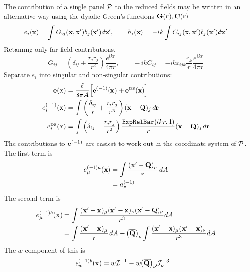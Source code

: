 \documentclass[letterpaper]{article}
\begin{document}
The contribution of a single panel $\mathcal{P}$ to the 
reduced fields may be written in an alternative way using the 
dyadic Green's functions $\mathbf{G}(\mathbf{r}), \mathbf{C}(\mathbf{r})$
$$
 e_i(\mathbf{x}) =   \int G_{ij}(\mathbf{x},\mathbf{x}^\prime) b_j(\mathbf{x}^\prime)d\mathbf{x}^\prime,
\qquad
 h_i(\mathbf{x}) = -ik\int C_{ij}(\mathbf{x},\mathbf{x}^\prime) b_j(\mathbf{x}^\prime)d\mathbf{x}^\prime
$$
Retaining only far-field contributions,
$$ 
 G_{ij}=\left( \delta_{ij} + \frac{r_i r_j}{r^2}\right) \frac{e^{ikr}}{4\pi r},
\qquad 
 -ikC_{ij}=-ik \varepsilon_{ijk} \frac{r_k}{r} \frac{e^{ikr}}{4\pi r} 
$$
Separate $e_{i}$ into singular and non-singular
contributions:
\begin{align*}
 \mathbf{e}(\mathbf{x}) &= 
 \frac{\ell}{8\pi A}\Big[ \mathbf{e}^{(-1)}(\mathbf{x}) + \mathbf{e}^{\hbox{\tiny{DS}}}(\mathbf{x})\Big]
\\
 e_i^{(-1)}(\mathbf{x}) 
 &=
 \int \left( \frac{\delta_{ij}}{r} 
             + \frac{r_i r_j}{r^3}
      \right) (\mathbf{x} - \mathbf{Q})_j \, d\mathbf{r}
\\
 e_i^{\hbox{\tiny{DS}}}(\mathbf{x})
&=
 \int \left( \delta_{ij} + \frac{r_i r_j}{r^2}
      \right) \frac{\texttt{ExpRelBar}(ikr,1)}{r}
      (\mathbf{x}-\mathbf{Q})_j \, d\mathbf{r}
\end{align*}
The contributions to $\mathbf{e}^{(-1)}$ are easiest to work out
in the coordinate system of $\mathcal{P}$. The first term is
\begin{align*}
 e_\mu^{(-1)a}(\mathbf{x})
&=\int \frac{ (\mathbf{x}^\prime-\mathbf{Q})_\mu}{r}\,dA
\\
&=a^{(-1)}_\mu
\end{align*}
The second term is
\begin{align*}
 e_\mu^{(-1)b}(\mathbf{x})
&= \int \frac { (\mathbf{x}^\prime-\mathbf{x})_\mu 
                (\mathbf{x}^\prime-\mathbf{x})_\nu
                (\mathbf{x}^\prime-\mathbf{Q})_\nu
              }{r^3} dA
\\
&= \int \frac { (\mathbf{x}^\prime-\mathbf{x})_\mu }{r}\,dA
  -\big(\overline{\mathbf{Q}}\big)_\nu
   \int \frac { (\mathbf{x}^\prime-\mathbf{x})_\mu
                (\mathbf{x}^\prime-\mathbf{x})_\nu
              } {r^3} dA
\end{align*}
The $w$ component of this is
\begin{align*}
 e_w^{(-1)b}(\mathbf{x})
&= w \mathcal{I}^{-1}
  -w \big(\overline{\mathbf{Q}}\big)_\nu \mathcal{J}_\nu^{-3}
\end{align*}
\end{document}
